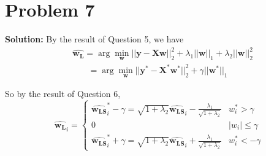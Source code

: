 \documentclass[11pt]{article}
\begin{document}
\section*{Problem 7}
\textbf{Solution:} 
By the result of Question 5, we have
\begin{align}
	&\hat{\mathbf{w_{\text{L}}}} = \arg\min_{\mathbf{w}} ||\mathbf{y} - \mathbf{Xw}||^2_2 + \lambda_1||\mathbf{w}||_1 + \lambda_2||\mathbf{w}||_2^2\nonumber\\
	&\phantom{\hat{\mathbf{w_{\text{LS}}}}} = \arg\min_{\mathbf{w}} ||\mathbf{y}^* - \mathbf{X}^*\mathbf{w}^*||^2_2 + \gamma||\mathbf{w}^*||_1\nonumber
\end{align}

So by the result of Question 6,
\[
	\hat{\mathbf{w_{\text{L}}}}_i =
	\begin{cases}
			\hat{\mathbf{w_{LS}}}_i^* - \gamma = \sqrt{1 + \lambda_2}\hat{\mathbf{w_{LS}}}_i -  \frac{\lambda_1}{\sqrt{1 + \lambda_2}} & w_i^* > \gamma \\
			0 & |w_i| \leq \gamma \\
			\hat{\mathbf{w_{LS}}}_i^* + \gamma = \sqrt{1 + \lambda_2}\hat{\mathbf{w_{LS}}}_i  + \frac{\lambda_1}{\sqrt{1 + \lambda_2}} & w_i^* < -\gamma
	\end{cases}\nonumber
\]
\newpage \nocite{*}


\end{document}
